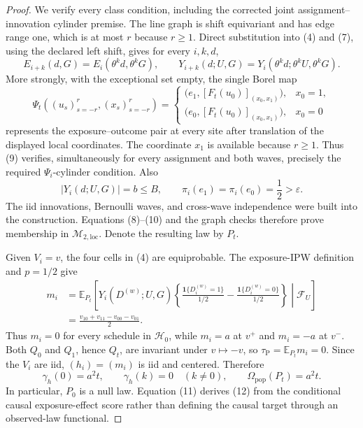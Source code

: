 \documentclass{article}
\begin{document}
\begin{proof}
We verify every class condition, including the corrected joint assignment--innovation cylinder premise.  The line graph is shift equivariant and has edge range one, which is at most \(r\) because \(r\ge1\).  Direct substitution into (4) and (7), using the declared left shift, gives for every \(i,k,d\),
\[
 E_{i+k}(d,G)=E_i(\theta^kd,\theta^kG),
 \qquad
 Y_{i+k}(d;U,G)=Y_i(\theta^kd;\theta^kU,\theta^kG). \tag{8}
\]
More strongly, with the exceptional set empty, the single Borel map
\[
 \Psi_t((u_s)_{s=-r}^{r},(x_s)_{s=-r}^{r})
 =
 \begin{cases}
  \bigl(e_1,[F_t(u_0)]_{(x_0,x_1)}\bigr),&x_0=1,\\
  \bigl(e_0,[F_t(u_0)]_{(x_0,x_1)}\bigr),&x_0=0
 \end{cases} \tag{9}
\]
represents the exposure--outcome pair at every site after translation of the displayed local coordinates.  The coordinate \(x_1\) is available because \(r\ge1\).  Thus (9) verifies, simultaneously for every assignment and both waves, precisely the required \(\Psi_i\)-cylinder condition.  Also
\[
 |Y_i(d;U,G)|=b\le B,
 \qquad
 \pi_i(e_1)=\pi_i(e_0)=\frac12>\varepsilon. \tag{10}
\]
The iid innovations, Bernoulli waves, and cross-wave independence were built into the construction.  Equations (8)--(10) and the graph checks therefore prove membership in \(\mathcal M_{2,\mathrm{loc}}\).  Denote the resulting law by \(P_t\).

Given \(V_i=v\), the four cells in (4) are equiprobable.  The exposure-IPW definition and \(p=1/2\) give
\[
 \begin{aligned}
 m_i
 &=\mathbb E_{P_t}\!\left[
  Y_i(D^{(w)};U,G)
  \left\{
   \frac{\mathbf 1\{D_i^{(w)}=1\}}{1/2}
   -\frac{\mathbf 1\{D_i^{(w)}=0\}}{1/2}
  \right\}
  \middle|\mathcal F_U
 \right]\\
 &=\frac{v_{10}+v_{11}-v_{00}-v_{01}}2.
 \end{aligned} \tag{11}
\]
Thus \(m_i=0\) for every schedule in \(\mathcal H_0\), while \(m_i=a\) at \(v^+\) and \(m_i=-a\) at \(v^-\).  Both \(Q_0\) and \(Q_1\), hence \(Q_t\), are invariant under \(v\mapsto-v\), so \(\tau_{\mathrm P}=\mathbb E_{P_t}m_i=0\).  Since the \(V_i\) are iid, \((h_i)=(m_i)\) is iid and centered.  Therefore
\[
 \gamma_h(0)=a^2t,
 \qquad
 \gamma_h(k)=0\quad(k\ne0),
 \qquad
 \Omega_{\mathrm{pop}}(P_t)=a^2t. \tag{12}
\]
In particular, \(P_0\) is a null law.  Equation (11) derives (12) from the conditional causal exposure-effect score rather than defining the causal target through an observed-law functional.


\end{proof}
\end{document}
